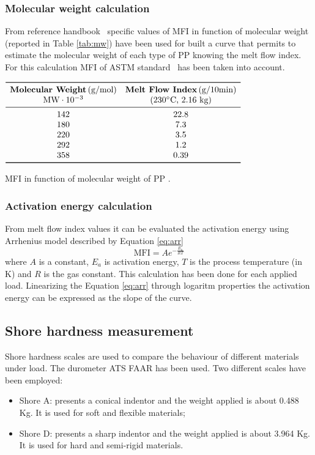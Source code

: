 \documentclass[a4paper, 11pt]{article}
\begin{document}
\subsubsection{Molecular weight calculation}
From reference handbook~\cite{handbook} specific values of MFI in function of molecular weight (reported in Table \ref{tab:mw}) have been used for built a curve that permits to estimate the molecular weight of each type of PP knowing the melt flow index. For this calculation MFI of ASTM standard~\cite{MFI} has been taken into account.
\begin{table}[htp]
	\centering
	$
	\begin{array}{cc}
	\toprule
	\textbf{Molecular Weight} \, \text{(g/mol)} & \textbf{Melt Flow Index} \, \text{(g/10min)} \\
	\text{MW}\cdot 10^{-3} & (230^\circ \text{C, 2.16 kg}) \\
	\midrule
	 142 & 22.8 \\
	 180 & 7.3 \\
	 220 & 3.5 \\
	 292 & 1.2 \\
	 358 & 0.39 \\
	\bottomrule
	\end{array}
	$
	\caption{MFI in function of molecular weight of PP .}
	\label{tab:mw}
\end{table}

\subsubsection{Activation energy calculation}
From melt flow index values it can be evaluated the activation energy using Arrhenius model described by Equation \ref{eq:arr}
\begin{equation}
\text{MFI} = A e ^{-\frac{E_a}{RT}}
\label{eq:arr}
\end{equation}
where $A$ is a constant, $E_a$ is activation energy, $T$ is the process temperature  (in K) and $R$ is the gas constant. This calculation has been done for each applied load. Linearizing the Equation \ref{eq:arr} through logaritm properties the activation energy can be expressed as the slope of the curve.

\subsection{Shore hardness measurement}

Shore hardness scales are used to compare the behaviour of different materials under load. The durometer ATS FAAR has been used.
Two different scales have been employed:
\begin{itemize}
\item Shore A: presents a conical indentor and the weight applied is about 0.488 Kg. It is used for soft and flexible materials;
\item Shore D: presents a sharp indentor and the weight applied is about 3.964 Kg. It is used for hard and semi-rigid materials.

\end{itemize}
\end{document}
